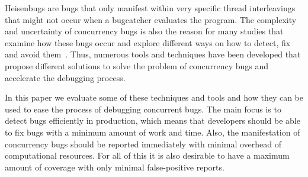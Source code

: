 \documentclass[conference]{IEEEtran}
\begin{document}
Heisenbugs are bugs that only manifest within very specific thread interleavings that might not occur when a bugcatcher evaluates the program.
The complexity and uncertainty of concurrency bugs is also the reason for many studies that examine how these bugs occur and explore different ways on how to detect, fix and avoid them~\cite{tu2019go}.
Thus, numerous tools and techniques have been developed that propose different solutions to solve the problem of concurrency bugs and accelerate the debugging process.

In this paper we evaluate some of these techniques and tools and how they can be used to ease the process of debugging concurrent bugs.
The main focus is to detect bugs efficiently in production, which means that developers should be able to fix bugs with a minimum amount of work and time.
Also, the manifestation of concurrency bugs should be reported immediately with minimal overhead of computational resources.
For all of this it is also desirable to have a maximum amount of coverage with only minimal false-positive reports.
\end{document}
